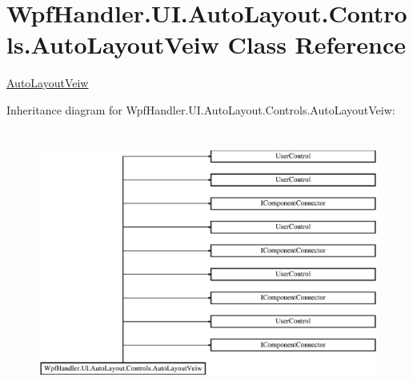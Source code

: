 \hypertarget{class_wpf_handler_1_1_u_i_1_1_auto_layout_1_1_controls_1_1_auto_layout_veiw}{}\section{Wpf\+Handler.\+U\+I.\+Auto\+Layout.\+Controls.\+Auto\+Layout\+Veiw Class Reference}
\label{class_wpf_handler_1_1_u_i_1_1_auto_layout_1_1_controls_1_1_auto_layout_veiw}


\mbox{\hyperlink{class_wpf_handler_1_1_u_i_1_1_auto_layout_1_1_controls_1_1_auto_layout_veiw}{Auto\+Layout\+Veiw}}  


Inheritance diagram for Wpf\+Handler.\+U\+I.\+Auto\+Layout.\+Controls.\+Auto\+Layout\+Veiw\+:\begin{figure}[H]
\begin{center}
\leavevmode
\includegraphics[height=8.832808cm]{d5/ddb/class_wpf_handler_1_1_u_i_1_1_auto_layout_1_1_controls_1_1_auto_layout_veiw}
\end{center}
\end{figure}
